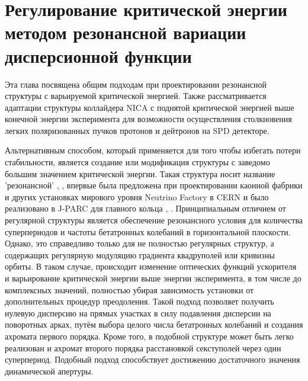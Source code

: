 
	\chapter{Регулирование критической энергии методом резонансной вариации дисперсионной функции}\label{ch:resonant}

\par Эта глава посвящена общим подходам при проектировании резонансной структуры с варьируемой критической энергией. Также рассматривается адаптации структуры коллайдера NICA с поднятой критической энергией выше конечной энергии эксперимента для возможности осуществления столкновения легких поляризованных пучков протонов и дейтронов на SPD детекторе.

\par	Альтернативным способом, который применяется для того чтобы избегать потери стабильности, является создание или модификация структуры с заведомо большим значением критической энергии. Такая структура носит название 'резонансной' \cite{senichev:resonant}, \cite{senichev:construction}, впервые была предложена при проектировании каонной фабрики \cite{kaon_tr} и других установках мирового уровня Neutrino Factory в CERN \cite{neutrino_tr} и было реализовано в J-PARC для главного кольца \cite{JHP_tr}, \cite{J-PARK_tr}. Принципиальным отличием от регулярной структуры является обеспечение резонансного условия для количества суперпериодов и частоты бетатронных колебаний в горизонтальной плоскости. Однако, это справедливо только для не полностью регулярных структур, а содержащих регулярную модуляцию градиента квадруполей или кривизны орбиты. В таком случае, происходит изменение оптических функций ускорителя и варьирование критической энергии выше энергии эксперимента, в том числе до комплексных значений, полностью убирая зависимость установки от дополнительных процедур преодоления. Такой подход позволяет получить нулевую дисперсию на прямых участках в силу подавления дисперсии на поворотных арках, путём выбора целого числа бетатронных колебаний и создания ахромата первого порядка. Кроме того, в подобной структуре может быть легко реализован и ахромат второго порядка расстановкой секступолей через один суперпериод. Подобный подход способствует достижению достаточного значения динамической апертуры.

\begin{comment}
В эксперименте по столкновению тяжелых ионов золота c максимальной энергией $E_{exp}=4.5$ ГэВ/нуклон критическая энергия магнитооптической структуры коллайдера составляет $E_{tr}^{Au-Au}=5.7$\ ГэВ ($\gamma_{tr}^{Au-Au}=7.1$). Такое значение критической энергии было достигнуто выбором частоты бетатронных колебаний в горизонтальной плоскости $\nu_x\approx\gamma_{tr}^{Au}>\gamma_{max}^{Au}\approx7.1$, которая  при условии регулярности структуры арок, состоящих из одинаковых ячеек ФОДО, должна быть больше максимального значения фактора Лоренца во всем интервале энергий.
\end{comment}

